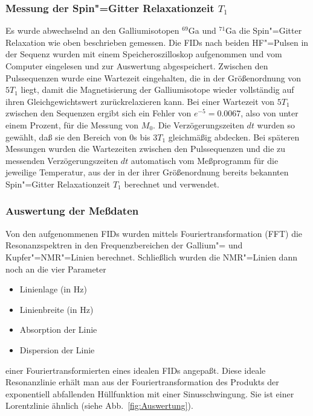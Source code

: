 \subsubsection{Messung der Spin"=Gitter Relaxationzeit $T_1$}

Es wurde abwechselnd an den Galliumisotopen $^{69}$Ga und $^{71}$Ga die Spin"=Gitter Relaxation wie
oben beschrieben gemessen. Die FIDs nach beiden HF"=Pulsen in der Sequenz wurden mit einem
Speicheroszilloskop aufgenommen und vom Computer eingelesen und zur Auswertung abgespeichert.
Zwischen den Pulssequenzen wurde eine Wartezeit eingehalten, die in der Größenordnung
von $5T_1$ liegt, damit die Magnetisierung der Galliumisotope wieder vollständig auf ihren
Gleichgewichtswert zurückrelaxieren kann. Bei einer Wartezeit von $5 T_1$ zwischen den
Sequenzen ergibt sich ein Fehler von $e^{-5}=0.0067$, also von unter einem Prozent, für die
Messung von $M_0$. Die
Verzögerungszeiten $dt$ wurden so gewählt, daß sie den Bereich von $0$s bis $3T_1$ gleichmäßig
abdecken. Bei späteren Messungen wurden die Wartezeiten zwischen den Pulssequenzen und die zu
messenden Verzögerungszeiten $dt$ automatisch vom Meßprogramm für die jeweilige Temperatur, aus der
in der ihrer Größenordnung bereits bekannten Spin"=Gitter Relaxationzeit $T_1$ berechnet und
verwendet.

\subsubsection{Auswertung der Meßdaten}

Von den aufgenommenen FIDs wurden mittels Fouriertransformation (FFT) die Resonanzspektren in den
Frequenzbereichen der Gallium"= und Kupfer"=NMR"=Linien berechnet. Schließlich wurden die NMR"=Linien
dann noch an die vier Parameter
 \begin{itemize}
	\item Linienlage (in Hz)
	\item Linienbreite (in Hz)
	\item Absorption der Linie
	\item Dispersion der Linie
 \end{itemize}
einer Fouriertransformierten eines idealen FIDs angepaßt. Diese ideale Resonanzlinie erhält man aus
der Fouriertransformation des Produkts der exponentiell abfallenden Hüllfunktion mit einer
Sinusschwingung. Sie ist einer Lorentzlinie ähnlich (siehe Abb.~\ref{fig:Auswertung}).

